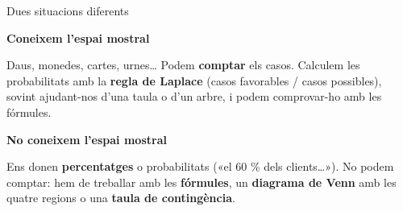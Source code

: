 \documentclass[11pt,a4paper]{article}
\newif\iffmstack\newif\iffmfit
\newcommand{\fmtwoin}[2]{\iffmstack #2\else #1\fi}
\begin{document}
\begin{fmdef}{Dues situacions diferents}
\fmtwoin{\par\noindent \begin{minipage}[t]{0.488\linewidth}\vspace{0pt}\begin{tcolorbox}[enhanced,colback=fmsurface,colframe=fmmuted!35,arc=2.5mm,boxrule=0.6pt,left=2.5mm,right=2.5mm,top=1.5mm,bottom=1.5mm,before upper=\raggedright,equal height group=cmp1]{\color{fmnavy}\bfseries Coneixem l'espai mostral}\par

Daus, monedes, cartes, urnes\dots{} Podem \textbf{comptar} els casos. Calculem les probabilitats amb la \textbf{regla de Laplace} (casos favorables / casos possibles), sovint ajudant-nos d'una taula o d'un arbre, i podem comprovar-ho amb les fórmules.\end{tcolorbox}\end{minipage}\hfill\begin{minipage}[t]{0.488\linewidth}\vspace{0pt}\begin{tcolorbox}[enhanced,colback=fmsurface,colframe=fmmuted!35,arc=2.5mm,boxrule=0.6pt,left=2.5mm,right=2.5mm,top=1.5mm,bottom=1.5mm,before upper=\raggedright,equal height group=cmp1]{\color{fmnavy}\bfseries No coneixem l'espai mostral}\par

Ens donen \textbf{percentatges} o probabilitats («el 60 \% dels clients\dots{}»). No podem comptar: hem de treballar amb les \textbf{fórmules}, un \textbf{diagrama de Venn} amb les quatre regions o una \textbf{taula de contingència}.\end{tcolorbox}\end{minipage}\par\medskip}{\begin{tcolorbox}[enhanced,breakable,colback=fmsurface,colframe=fmmuted!35,arc=2.5mm,boxrule=0.6pt,left=2.5mm,right=2.5mm,top=1.5mm,bottom=1.5mm,before upper=\raggedright]{\color{fmnavy}\bfseries Coneixem l'espai mostral}\par

Daus, monedes, cartes, urnes\dots{} Podem \textbf{comptar} els casos. Calculem les probabilitats amb la \textbf{regla de Laplace} (casos favorables / casos possibles), sovint ajudant-nos d'una taula o d'un arbre, i podem comprovar-ho amb les fórmules.\end{tcolorbox}\begin{tcolorbox}[enhanced,breakable,colback=fmsurface,colframe=fmmuted!35,arc=2.5mm,boxrule=0.6pt,left=2.5mm,right=2.5mm,top=1.5mm,bottom=1.5mm,before upper=\raggedright]{\color{fmnavy}\bfseries No coneixem l'espai mostral}\par

Ens donen \textbf{percentatges} o probabilitats («el 60 \% dels clients\dots{}»). No podem comptar: hem de treballar amb les \textbf{fórmules}, un \textbf{diagrama de Venn} amb les quatre regions o una \textbf{taula de contingència}.\end{tcolorbox}}
\end{fmdef}\global\fmstackfalse
\end{document}
